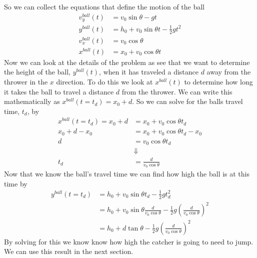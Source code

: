 \documentclass[11pt]{article}
\begin{document}
So we can collect the equations that define the motion of the ball
\begin{align*}
v^{ball}_{y}(t) &= v_0\sin\theta - gt\\
y^{ball}(t) &= h_0 + v_0\sin\theta t - \frac{1}{2}gt^2\\
v^{ball}_x(t) &= v_0\cos\theta\\
x^{ball}(t) &= x_0 + v_0\cos\theta t
\end{align*}
Now we can look at the details of the problem as see that we want to determine the height of
the ball, $y^{ball}(t)$, when it has traveled a distance $d$ away from the thrower in the $x$
direction. To do this we look at $x^{ball}(t)$ to determine how long it takes the ball to 
travel a distance $d$ from the thrower. We can write this mathematically as 
$x^{ball}(t=t_d) = x_0+d$. So we can solve for the balls travel time, $t_d$, by 
\begin{align*}
x^{ball}(t=t_d) = x_0+d &= x_0 +v_0\cos\theta t_d\\ 
x_0+d-x_0 &= x_0 +v_0\cos\theta t_d -x_0\\ 
d &= v_0\cos\theta t_d \\ 
&\Downarrow\\
t_d &= \frac{d}{v_0\cos\theta}
\end{align*}
Now that we know the ball's travel time we can find how high the ball is at this time by
\begin{align*}
y^{ball}(t=t_d) &= h_0 + v_0\sin\theta t_d - \frac{1}{2}gt_d^2\\
&= h_0 + v_0\sin\theta \frac{d}{v_0\cos\theta} - \frac{1}{2}g\left(\frac{d}{v_0\cos\theta}\right)^2\\
&= h_0 + d\tan\theta - \frac{1}{2}g\left(\frac{d}{v_0\cos\theta}\right)^2
\end{align*}
By solving for this we know know how high the catcher is going to need to jump. We can use 
this result in the next section.
\end{document}
